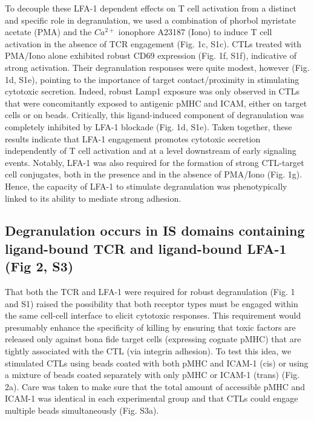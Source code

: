 To decouple these LFA-1 dependent effects on T cell activation from a distinct and specific role in degranulation, we used a combination of phorbol myristate acetate (PMA) and the $Ca^{2+}$ ionophore A23187 (Iono) to induce T cell activation in the absence of TCR engagement (Fig. 1c, S1c). CTLs treated with PMA/Iono alone exhibited robust CD69 expression (Fig. 1f, S1f), indicative of strong activation. Their degranulation responses were quite modest, however (Fig. 1d, S1e), pointing to the importance of target contact/proximity in stimulating cytotoxic secretion. Indeed, robust Lamp1 exposure was only observed in CTLs that were concomitantly exposed to antigenic pMHC and ICAM, either on target cells or on beads. Critically, this ligand-induced component of degranulation was completely inhibited by LFA-1 blockade (Fig. 1d, S1e). Taken together, these results indicate that LFA-1 engagement promotes cytotoxic secretion independently of T cell activation and at a level downstream of early signaling events. Notably, LFA-1 was also required for the formation of strong CTL-target cell conjugates, both in the presence and in the absence of PMA/Iono (Fig. 1g). Hence, the capacity of LFA-1 to stimulate degranulation was phenotypically linked to its ability to mediate strong adhesion. 

\subsection{Degranulation occurs in IS domains containing ligand-bound TCR and ligand-bound LFA-1 (Fig 2, S3)}
That both the TCR and LFA-1 were required for robust degranulation (Fig. 1 and S1) raised the possibility that both receptor types must be engaged within the same cell-cell interface to elicit cytotoxic responses. This requirement would presumably enhance the specificity of killing by ensuring that toxic factors are released only against bona fide target cells (expressing cognate pMHC) that are tightly associated with the CTL (via integrin adhesion). To test this idea, we stimulated CTLs using beads coated with both pMHC and ICAM-1 (cis) or using a mixture of beads coated separately with only pMHC or ICAM-1 (trans) (Fig. 2a). Care was taken to make sure that the total amount of accessible pMHC and ICAM-1 was identical in each experimental group and that CTLs could engage multiple beads simultaneously (Fig. S3a). 

